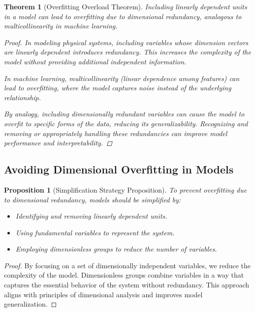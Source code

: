 \documentclass{article}
\newtheorem{theorem}{Theorem}[section]
\newtheorem{proposition}{Proposition}[section]
\theoremstyle{definition}
\theoremstyle{remark}
\begin{document}
	\begin{theorem}[Overfitting Overload Theorem]
		Including linearly dependent units in a model can lead to overfitting due to dimensional redundancy, analogous to multicollinearity in machine learning.
		
		\begin{proof}
			In modeling physical systems, including variables whose dimension vectors are linearly dependent introduces redundancy. This increases the complexity of the model without providing additional independent information.
			
			In machine learning, multicollinearity (linear dependence among features) can lead to overfitting, where the model captures noise instead of the underlying relationship.
			
			By analogy, including dimensionally redundant variables can cause the model to overfit to specific forms of the data, reducing its generalizability. Recognizing and removing or appropriately handling these redundancies can improve model performance and interpretability.
		\end{proof}
	\end{theorem}
	
	\subsection{Avoiding Dimensional Overfitting in Models}
	
	\begin{proposition}[Simplification Strategy Proposition]
		To prevent overfitting due to dimensional redundancy, models should be simplified by:
		\begin{itemize}
			\item Identifying and removing linearly dependent units.
			\item Using fundamental variables to represent the system.
			\item Employing dimensionless groups to reduce the number of variables.
		\end{itemize}
	\end{proposition}
	
	\begin{proof}
		By focusing on a set of dimensionally independent variables, we reduce the complexity of the model. Dimensionless groups combine variables in a way that captures the essential behavior of the system without redundancy. This approach aligns with principles of dimensional analysis and improves model generalization.
	\end{proof}
	
\end{document}
